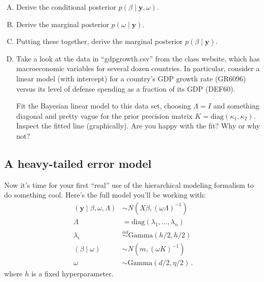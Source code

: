 \documentclass{mynotes}
\newcommand{\by}{\textbf{y}}
\begin{document}
\begin{enumerate}[(A)]

\item Derive the conditional posterior $p(\beta \mid \by, \omega)$.

\item Derive the marginal posterior $p(\omega \mid \by)$.

\item Putting these together, derive the marginal posterior $p(\beta \mid \by)$.

\item Take a look at the data in ``gdpgrowth.csv'' from the class website, which has macroeconomic variables for several dozen countries.  In particular, consider a linear model (with intercept) for a country's GDP growth rate (GR6096) versus its level of defense spending as a fraction of its GDP (DEF60).

Fit the Bayesian linear model to this data set, choosing $\Lambda = I$ and something diagonal and pretty vague for the prior precision matrix $K = \mbox{diag}(\kappa_1, \kappa_2)$.  Inspect the fitted line (graphically).  Are you happy with the fit?  Why or why not?

\end{enumerate}


\subsection{A heavy-tailed error model}


Now it's time for your first ``real'' use of the hierarchical modeling formalism to do something cool.  Here's the full model you'll be working with:
\begin{align}
(\by \mid \beta, \omega, \Lambda) &\sim N(X \beta, (\omega \Lambda)^{-1}) \\
\Lambda &= \mbox{diag}(\lambda_1, \ldots, \lambda_n) \\
\lambda_i &\stackrel{iid}{\sim} \mbox{Gamma}(h/2, h/2) \\
(\beta \mid \omega) &\sim N(m, (\omega K)^{-1}) \\
\omega &\sim \mbox{Gamma}(d/2, \eta/2) \, .
\end{align}
where $h$ is a fixed hyperparameter.
\end{document}

